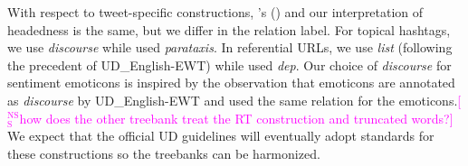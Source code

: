 \documentclass[11pt,a4paper]{article}
\newcommand{\citeposs}[2][]{\citeauthor{#2}'s (\citeyear[#1]{#2})}
\newcommand{\nss}[1]{\textcolor{magenta}{[$_\mathrm{S}^\mathrm{NS}$#1]}}
\begin{document}
With respect to tweet-specific constructions,
\citeposs{sanguinetti-17} and our  interpretation of headedness is the same, 
but we differ in the relation label.
For topical hashtags, we use \textit{discourse} while \citet{sanguinetti-17} used \textit{parataxis}. 
In referential URLs, we use \textit{list} (following the precedent of UD\_English-EWT) while \citet{sanguinetti-17} used \textit{dep}.
Our choice of \textit{discourse} for sentiment emoticons
is inspired by the observation that emoticons are annotated as \textit{discourse} by UD\_English-EWT
and \citet{sanguinetti-17} used the same relation for the emoticons.\nss{how does the other treebank treat the RT construction and truncated words?}
We expect that the official UD guidelines will eventually adopt standards for these constructions so the treebanks can be harmonized.



\end{document}
